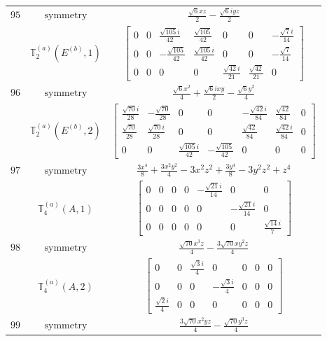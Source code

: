 \documentclass[fleqn,8pt,landscape]{jsarticle}
\begin{document}
\begin{longtable}{ccc}
$ 95 $ & $ \text{symmetry} $ & $ \frac{\sqrt{6} x z}{2} - \frac{\sqrt{6} i y z}{2} $ \\
$  $ & $ \mathbb{T}_{2}^{(a)}(E^{(b)},1) $ & $ \begin{bmatrix} 0 & 0 & \frac{\sqrt{105} i}{42} & \frac{\sqrt{105}}{42} & 0 & 0 & - \frac{\sqrt{7} i}{14} \\ 0 & 0 & - \frac{\sqrt{105}}{42} & \frac{\sqrt{105} i}{42} & 0 & 0 & - \frac{\sqrt{7}}{14} \\ 0 & 0 & 0 & 0 & \frac{\sqrt{42} i}{21} & \frac{\sqrt{42}}{21} & 0 \end{bmatrix} $ \\ \hline
$ 96 $ & $ \text{symmetry} $ & $ \frac{\sqrt{6} x^{2}}{4} + \frac{\sqrt{6} i x y}{2} - \frac{\sqrt{6} y^{2}}{4} $ \\
$  $ & $ \mathbb{T}_{2}^{(a)}(E^{(b)},2) $ & $ \begin{bmatrix} \frac{\sqrt{70} i}{28} & - \frac{\sqrt{70}}{28} & 0 & 0 & - \frac{\sqrt{42} i}{84} & \frac{\sqrt{42}}{84} & 0 \\ \frac{\sqrt{70}}{28} & \frac{\sqrt{70} i}{28} & 0 & 0 & \frac{\sqrt{42}}{84} & \frac{\sqrt{42} i}{84} & 0 \\ 0 & 0 & \frac{\sqrt{105} i}{42} & - \frac{\sqrt{105}}{42} & 0 & 0 & 0 \end{bmatrix} $ \\ \hline
$ 97 $ & $ \text{symmetry} $ & $ \frac{3 x^{4}}{8} + \frac{3 x^{2} y^{2}}{4} - 3 x^{2} z^{2} + \frac{3 y^{4}}{8} - 3 y^{2} z^{2} + z^{4} $ \\
$  $ & $ \mathbb{T}_{4}^{(a)}(A,1) $ & $ \begin{bmatrix} 0 & 0 & 0 & 0 & - \frac{\sqrt{21} i}{14} & 0 & 0 \\ 0 & 0 & 0 & 0 & 0 & - \frac{\sqrt{21} i}{14} & 0 \\ 0 & 0 & 0 & 0 & 0 & 0 & \frac{\sqrt{14} i}{7} \end{bmatrix} $ \\ \hline
$ 98 $ & $ \text{symmetry} $ & $ \frac{\sqrt{70} x^{3} z}{4} - \frac{3 \sqrt{70} x y^{2} z}{4} $ \\
$  $ & $ \mathbb{T}_{4}^{(a)}(A,2) $ & $ \begin{bmatrix} 0 & 0 & \frac{\sqrt{3} i}{4} & 0 & 0 & 0 & 0 \\ 0 & 0 & 0 & - \frac{\sqrt{3} i}{4} & 0 & 0 & 0 \\ \frac{\sqrt{2} i}{4} & 0 & 0 & 0 & 0 & 0 & 0 \end{bmatrix} $ \\ \hline
$ 99 $ & $ \text{symmetry} $ & $ \frac{3 \sqrt{70} x^{2} y z}{4} - \frac{\sqrt{70} y^{3} z}{4} $ \\

\end{longtable}
\end{document}
